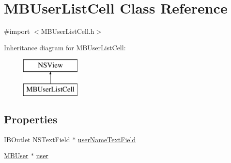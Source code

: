 \hypertarget{interface_m_b_user_list_cell}{\section{M\-B\-User\-List\-Cell Class Reference}
\label{interface_m_b_user_list_cell}
}


{\ttfamily \#import $<$M\-B\-User\-List\-Cell.\-h$>$}

Inheritance diagram for M\-B\-User\-List\-Cell\-:\begin{figure}[H]
\begin{center}
\leavevmode
\includegraphics[height=2.000000cm]{interface_m_b_user_list_cell}
\end{center}
\end{figure}
\subsection*{Properties}
\begin{DoxyCompactItemize}
\item 
I\-B\-Outlet N\-S\-Text\-Field $\ast$ \hyperlink{interface_m_b_user_list_cell_a978cf8e81d871e3de60e37109cce26e5}{user\-Name\-Text\-Field}
\item 
\hyperlink{interface_m_b_user}{M\-B\-User} $\ast$ \hyperlink{interface_m_b_user_list_cell_ae8dc212338dc50b6c516604ef10ae664}{user}
\end{DoxyCompactItemize}


